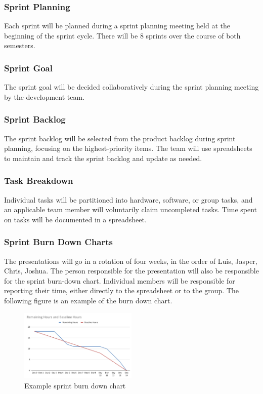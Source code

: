 \subsubsection{Sprint Planning}
Each sprint will be planned during a sprint planning meeting held at the beginning of the sprint cycle. There will be 8 sprints over the course of both semesters.
\subsubsection{Sprint Goal} 
The sprint goal will be decided collaboratively during the sprint planning meeting by the development team.
\subsubsection{Sprint Backlog}
The sprint backlog will be selected from the product backlog during sprint planning, focusing on the highest-priority items. The team will use spreadsheets to maintain and track the sprint backlog and update as needed.

\subsubsection{Task Breakdown}
Individual tasks will be partitioned into hardware, software, or group tasks, and an applicable team member will voluntarily claim uncompleted tasks. Time spent on tasks will be documented in a spreadsheet.

\subsubsection{Sprint Burn Down Charts}
The presentations will go in a rotation of four weeks, in the order of Luis, Jasper, Chris, Joshua. The person responsible for the presentation will also be responsible for the sprint burn-down chart. Individual members will be responsible for reporting their time, either directly to the spreadsheet or to the group. The following figure is an example of the burn down chart.

\begin{figure}[h!]
    \centering
    \includegraphics[width=0.5\textwidth]{images/burndown}
    \caption{Example sprint burn down chart}
\end{figure}

